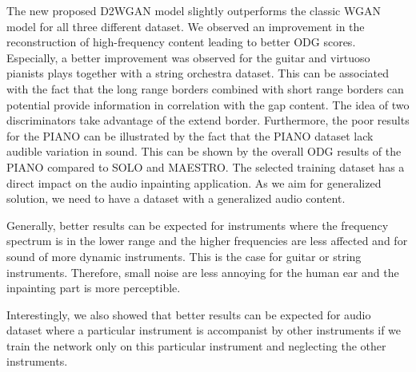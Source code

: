 \documentclass{article} %
\begin{document}
The new proposed D2WGAN model slightly outperforms the classic WGAN model for all three different dataset. We observed an improvement in the reconstruction of high-frequency content leading to better ODG scores. Especially, a better improvement was observed for the guitar and virtuoso pianists plays together with a string orchestra dataset. 
This can be associated with the fact that the long range borders combined with short range borders can potential provide information in correlation with the gap content. The idea of two discriminators take advantage of the extend border. 
Furthermore, the poor results for the PIANO can be illustrated by the fact that the PIANO dataset lack audible variation in sound. This can be shown by the overall ODG results of the PIANO compared to SOLO and MAESTRO. The selected training dataset has a direct impact on the audio inpainting application. As we aim for generalized solution, we need to have a dataset with a generalized audio content. 

Generally, better results can be expected for instruments where the frequency spectrum is in the lower range and the higher frequencies are less affected and for sound of more dynamic instruments. This is the case for guitar or string instruments. Therefore, small noise are less annoying for the human ear and the inpainting part is more perceptible.

Interestingly, we also showed that better results can be expected for audio dataset where a particular instrument is accompanist by other instruments if we train the network only on this particular instrument and neglecting the other instruments.
\end{document}
